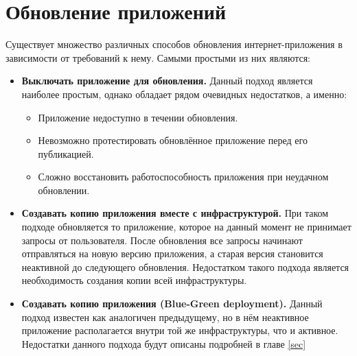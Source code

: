 \section{Обновление приложений}
Существует множество различных способов обновления интернет-приложения в зависимости от требований к нему. Самыми простыми из них являются:
\begin{itemize}
	\item {\bf Выключать приложение для обновления.} Данный подход является наиболее простым, однако обладает рядом очевидных недостатков, а именно:
	\begin{itemize}
		\item Приложение недоступно в течении обновления.
		\item Невозможно протестировать обновлённое приложение перед его публикацией.
		\item Сложно восстановить работоспособность приложения при неудачном обновлении.
	\end{itemize}
	\item {\bf Создавать копию приложения вместе с инфраструктурой.} При таком подходе обновляется то приложение, которое на данный момент не принимает запросы от пользователя. После обновления все запросы начинают отправляться на новую версию приложения, а старая версия становится неактивной до следующего обновления. Недостатком такого подхода является необходимость создания копии всей инфраструктуры.
	\item {\bf Создавать копию приложения (Blue-Green deployment).} Данный подход известен  как аналогичен предыдущему, но в нём неактивное приложение располагается внутри той же инфраструктуры, что и активное. Недостатки данного подхода будут описаны подробней в главе \ref{sec}
\end{itemize}